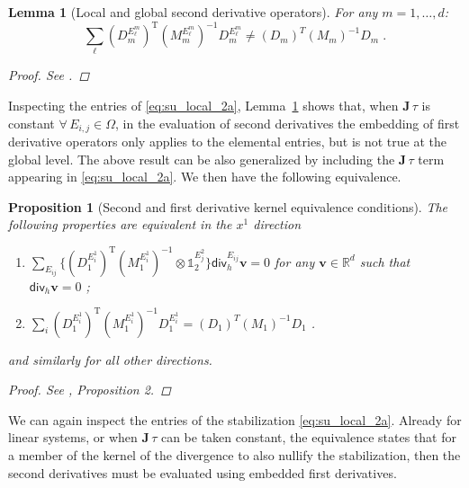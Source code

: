 \documentclass[a4paper,10pt]{article}
\newtheorem{proposition}[theorem]{Proposition}
\newtheorem{lemma}[theorem]{Lemma}
\newcommand{\id}{\mathds{1}}
\begin{document}
\begin{lemma}[Local and global second derivative operators] \label{lem:nosp} For any $m=1,\dots,d$:
$$
\sum_{\ell}     (D_m^{E_\ell^{m}})^{\mathrm{T}}  (M_m^{E_\ell^{m}})^{-1}   D_m^{E_\ell^{m}}     \ne
(D_m)^T (M_m)^{-1} D_m\;. 
$$
\begin{proof}
See \cite[Proposition 3]{barsukow2025structure}.
\end{proof}
\end{lemma}
Inspecting the entries  of \eqref{eq:su_local_2a}, Lemma~\ref{lem:nosp} shows   that, 
when   $\mathbf{J}\,\tau$ is constant   $\forall\, E_{i,j}\in\Omega$,    in the evaluation of second derivatives
the embedding of first derivative operators  only applies to the elemental entries, but is not true at the global  level.
The above result can be also generalized by including the $\mathbf{J}\,\tau$ term appearing in \eqref{eq:su_local_2a}.
We then have the following equivalence.

\begin{proposition}[Second  and first derivative kernel equivalence conditions]  \label{prop:equi} 
The following properties are equivalent in the $x^1$ direction
\begin{enumerate}
\item $ \sum_{E_{ij}}\Big\{ (D_1^{E_i^{1}})^{\mathrm{T}}  (M_1^{E_i^{1}})^{-1}      \otimes \id_2^{E_j^{2}} \Big\}\textsf{div}_h^{E_{ij}}\mathbf{v} = 0$   for any $\mathbf{v}\in\mathbb{R}^d $ such that $\textsf{div}_h\mathbf{v}=0$ ;
\item  $ \sum_{i}     (D_1^{E_i^{1}})^{\mathrm{T}}  (M_1^{E_i^{1}})^{-1}   D_1^{E_i^{1}}     = (D_1)^T (M_1)^{-1} D_1$ .
\end{enumerate}
and similarly for all other directions. 
\begin{proof}
See \cite{barsukow2025structure}, Proposition 2.
\end{proof}
\end{proposition} 
We can again inspect the entries of the stabilization \eqref{eq:su_local_2a}.  Already for linear systems, or when 
$\mathbf{J}\,\tau$ can be taken constant,  the equivalence states that for a member of the kernel of the divergence
to also nullify the stabilization, then the second derivatives must be evaluated using embedded first derivatives.
\end{document}
